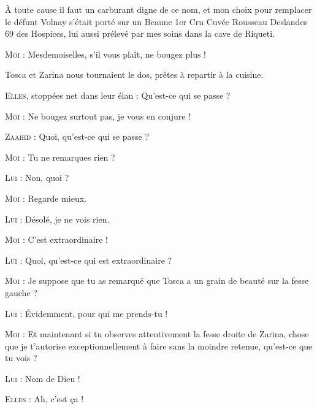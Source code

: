 %

À toute cause il faut un carburant digne de ce nom, et mon choix pour remplacer le défunt Volnay s’était porté sur un Beaune 1er Cru Cuvée Rousseau Deslandes 69 des Hospices, lui aussi prélevé par mes soins dans la cave de Riqueti.

\begin{dialogue}

\textsc{Moi} : Mesdemoiselles, s’il vous plaît, ne bougez plus !

\end{dialogue}

Tosca et Zarina nous tournaient le dos, prêtes à repartir à la cuisine.

\begin{dialogue}

\textsc{Elles}, stoppées net dans leur élan : Qu’est-ce qui se passe ?

\textsc{Moi} : Ne bougez surtout pas, je vous en conjure !

\textsc{Zaahid} : Quoi, qu’est-ce qui se passe ?

\textsc{Moi} : Tu ne remarques rien ?

\textsc{Lui} : Non, quoi ?

\textsc{Moi} : Regarde mieux.

\textsc{Lui} : Désolé, je ne vois rien.

\textsc{Moi} : C’est extraordinaire !

\textsc{Lui} : Quoi, qu’est-ce qui est extraordinaire ?

\textsc{Moi} : Je suppose que tu as remarqué que Tosca a un grain de beauté sur la fesse gauche ?

\textsc{Lui} : Évidemment, pour qui me prends-tu !

\textsc{Moi} : Et maintenant si tu observes attentivement la fesse droite de Zarina, chose que je t’autorise exceptionnellement à faire sans la moindre retenue, qu’est-ce que tu vois ?

\textsc{Lui} : Nom de Dieu !

\textsc{Elles} : Ah, c’est ça !

\end{dialogue}

